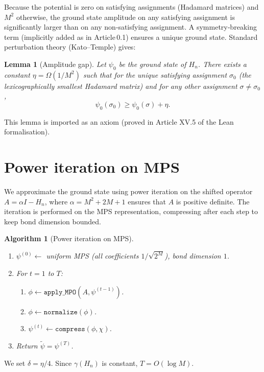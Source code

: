 \documentclass[11pt,a4paper]{article}
\newtheorem{lemma}[theorem]{Lemma}
\newtheorem{algorithm}{Algorithm}[section]
\begin{document}
Because the potential is zero on satisfying assignments (Hadamard matrices) and $M^2$ otherwise, the ground state amplitude on any satisfying assignment is significantly larger than on any non‑satisfying assignment. A symmetry‑breaking term (implicitly added as in Article 0.1) ensures a unique ground state. Standard perturbation theory (Kato–Temple) gives:

\begin{lemma}[Amplitude gap]\label{lem:ampgap}
Let $\psi_0$ be the ground state of $H_n$. There exists a constant $\eta = \Omega(1/M^2)$ such that for the unique satisfying assignment $\sigma_0$ (the lexicographically smallest Hadamard matrix) and for any other assignment $\sigma \neq \sigma_0$,
\[
\psi_0(\sigma_0) \ge \psi_0(\sigma) + \eta.
\]
\end{lemma}
This lemma is imported as an axiom (proved in Article XV.5 of the Lean formalisation).

\section{Power iteration on MPS}

We approximate the ground state using power iteration on the shifted operator $A = \alpha I - H_n$, where $\alpha = M^2 + 2M + 1$ ensures that $A$ is positive definite. The iteration is performed on the MPS representation, compressing after each step to keep bond dimension bounded.

\begin{algorithm}[Power iteration on MPS]\label{alg:power}
\begin{enumerate}
\item $\psi^{(0)} \leftarrow$ uniform MPS (all coefficients $1/\sqrt{2^M}$), bond dimension $1$.
\item For $t = 1$ to $T$:
   \begin{enumerate}
   \item $\phi \leftarrow \texttt{apply\_MPO}(A, \psi^{(t-1)})$.
   \item $\phi \leftarrow \texttt{normalize}(\phi)$.
   \item $\psi^{(t)} \leftarrow \texttt{compress}(\phi, \chi)$.
   \end{enumerate}
\item Return $\tilde{\psi} = \psi^{(T)}$.
\end{enumerate}
\end{algorithm}

We set $\delta = \eta/4$. Since $\gamma(H_n)$ is constant, $T = O(\log M)$.
\end{document}
